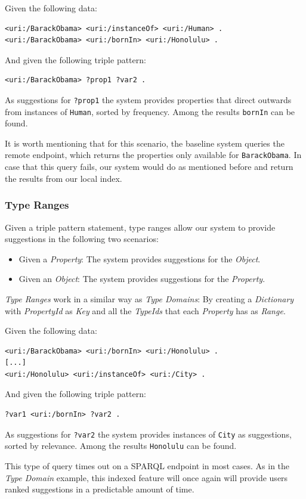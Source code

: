 \begin{example}
Given the following data:
\begin{verbatim}
<uri:/BarackObama> <uri:/instanceOf> <uri:/Human> .
<uri:/BarackObama> <uri:/bornIn> <uri:/Honolulu> .
\end{verbatim}

And given the following triple pattern:
\begin{verbatim}
<uri:/BarackObama> ?prop1 ?var2 .
\end{verbatim}

As suggestions for \texttt{?prop1} the system provides properties that direct outwards from instances of \texttt{Human}, sorted by frequency. Among the results \texttt{bornIn} can be found.

It is worth mentioning that for this scenario, the baseline system queries the remote endpoint, which returns the properties only available for \texttt{BarackObama}. In case that this query fails, our system would do as mentioned before and return the results from our local index.
\end{example}

\subsubsection{Type Ranges}

Given a triple pattern statement, type ranges allow our system to provide suggestions in the following two scenarios:
\begin{itemize}
    \item Given a \textit{Property}: The system provides suggestions for the \textit{Object}.
    \item Given an \textit{Object}: The system provides suggestions for the \textit{Property}.
\end{itemize}

\textit{Type Ranges} work in a similar way as \textit{Type Domains}: By creating a \textit{Dictionary} with \textit{PropertyId} as \textit{Key} and all the \textit{TypeIds} that each \textit{Property} has as \textit{Range}.

\begin{example}
Given the following data:
\begin{verbatim}
<uri:/BarackObama> <uri:/bornIn> <uri:/Honolulu> .
[...]
<uri:/Honolulu> <uri:/instanceOf> <uri:/City> .
\end{verbatim}

And given the following triple pattern:
\begin{verbatim}
?var1 <uri:/bornIn> ?var2 .
\end{verbatim}

As suggestions for \texttt{?var2} the system provides instances of \texttt{City} as suggestions, sorted by relevance. Among the results \texttt{Honolulu} can be found.

This type of query times out on a SPARQL endpoint in most cases. As in the \textit{Type Domain} example, this indexed feature will once again will provide users ranked suggestions in a predictable amount of time.
\end{example}

